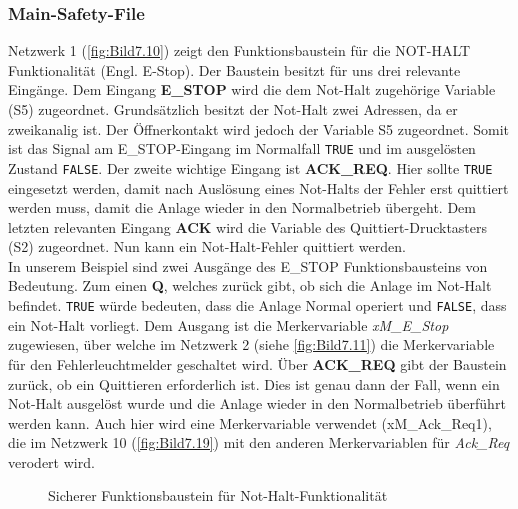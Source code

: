 \renewcommand{\arraystretch}{1}

\clearpage

\subsubsection{Main-Safety-File} \label{sec:main-safety}

Netzwerk 1 (\autoref{fig:Bild7.10}) zeigt den Funktionsbaustein für die NOT-HALT Funktionalität (Engl.\xspace E-Stop). Der Baustein besitzt für uns drei relevante Eingänge. Dem Eingang \textbf{E\_STOP} wird die dem Not-Halt zugehörige Variable (S5) zugeordnet. Grundsätzlich besitzt der Not-Halt zwei Adressen, da er zweikanalig ist. Der Öffnerkontakt wird jedoch der Variable S5 zugeordnet. Somit ist das Signal am E\_STOP-Eingang im Normalfall \texttt{TRUE} und im ausgelösten Zustand \texttt{FALSE}. Der zweite wichtige Eingang ist \textbf{ACK_REQ}. Hier sollte \texttt{TRUE} eingesetzt werden, damit nach Auslösung eines Not-Halts der Fehler erst quittiert werden muss, damit die Anlage wieder in den Normalbetrieb übergeht. Dem letzten relevanten Eingang \textbf{ACK} wird die Variable des Quittiert-Drucktasters (S2) zugeordnet. Nun kann ein Not-Halt-Fehler quittiert werden. \\
In unserem Beispiel sind zwei Ausgänge des E\_STOP Funktionsbausteins von Bedeutung. Zum einen \textbf{Q}, welches zurück gibt, ob sich die Anlage im Not-Halt befindet. \texttt{TRUE} würde bedeuten, dass die Anlage Normal operiert und \texttt{FALSE}, dass ein Not-Halt vorliegt. Dem Ausgang ist die Merkervariable \textit{xM\_E\_Stop} zugewiesen, über welche im Netzwerk 2 (siehe \autoref{fig:Bild7.11}) die Merkervariable für den Fehlerleuchtmelder geschaltet wird. Über \textbf{ACK_REQ} gibt der Baustein zurück, ob ein Quittieren erforderlich ist. Dies ist genau dann der Fall, wenn ein Not-Halt ausgelöst wurde und die Anlage wieder in den Normalbetrieb überführt werden kann. Auch hier wird eine Merkervariable verwendet (xM\_Ack\_Req1), die im Netzwerk 10 (\autoref{fig:Bild7.19}) mit den anderen Merkervariablen für \textit{Ack\_Req} verodert wird.

\begin{figure}[H]
   \centering
   \caption[Not-Halt FB]{Sicherer Funktionsbaustein für Not-Halt-Funktionalität}
   \label{fig:Bild7.10}
\end{figure}


